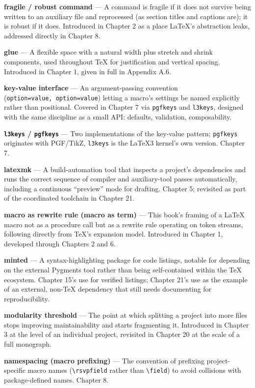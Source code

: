 \textbf{fragile / robust command} --- A command is fragile if it does not survive being written to an auxiliary file and reprocessed (as section titles and captions are); it is robust if it does. Introduced in Chapter 2 as a place LaTeX's abstraction leaks, addressed directly in Chapter 8.

\textbf{glue} --- A flexible space with a natural width plus stretch and shrink components, used throughout TeX for justification and vertical spacing. Introduced in Chapter 1, given in full in Appendix A.6.

\textbf{key-value interface} --- An argument-passing convention (\texttt{option=value,\ option=value}) letting a macro's settings be named explicitly rather than positional. Covered in Chapter 7 via \texttt{pgfkeys} and \texttt{l3keys}, designed with the same discipline as a small API: defaults, validation, composability.

\textbf{\texttt{l3keys} / \texttt{pgfkeys}} --- Two implementations of the key-value pattern; \texttt{pgfkeys} originates with PGF/TikZ, \texttt{l3keys} is the LaTeX3 kernel's own version. Chapter 7.

\textbf{latexmk} --- A build-automation tool that inspects a project's dependencies and runs the correct sequence of compiler and auxiliary-tool passes automatically, including a continuous ``preview'' mode for drafting. Chapter 5; revisited as part of the coordinated toolchain in Chapter 21.

\textbf{macro as rewrite rule (macro as term)} --- This book's framing of a LaTeX macro not as a procedure call but as a rewrite rule operating on token streams, following directly from TeX's expansion model. Introduced in Chapter 1, developed through Chapters 2 and 6.

\textbf{minted} --- A syntax-highlighting package for code listings, notable for depending on the external Pygments tool rather than being self-contained within the TeX ecosystem. Chapter 15's use for verified listings; Chapter 21's use as the example of an external, non-TeX dependency that still needs documenting for reproducibility.

\textbf{modularity threshold} --- The point at which splitting a project into more files stops improving maintainability and starts fragmenting it. Introduced in Chapter 3 at the level of an individual project, revisited in Chapter 20 at the scale of a full monograph.

\textbf{namespacing (macro prefixing)} --- The convention of prefixing project-specific macro names (\texttt{\textbackslash{}rsvpfield} rather than \texttt{\textbackslash{}field}) to avoid collisions with package-defined names. Chapter 8.

